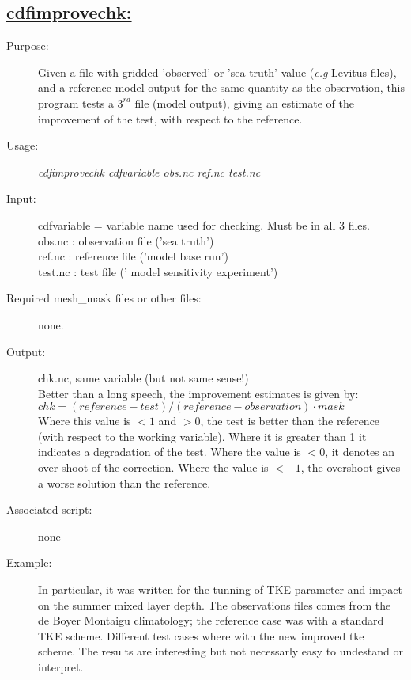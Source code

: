 \documentclass[a4paper,11pt]{article}
\begin{document}
\newpage
\subsection*{\underline{cdfimprovechk:}}
\begin{description}
\item[Purpose:] Given a file with gridded 'observed' or 'sea-truth' value ({\it e.g}  Levitus files), and a reference model output for the
same quantity as the observation, this program tests a $3^{rd}$ file (model output), giving an estimate of the improvement of the test,
with respect to the reference. 
\item[Usage:] {\em cdfimprovechk  cdfvariable obs.nc ref.nc test.nc }
\item[Input:]   cdfvariable = variable name used for checking. Must be in all 3 files. \\
                  obs.nc : observation file ('sea truth') \\
                  ref.nc : reference file ('model base run') \\
                  test.nc : test file (' model sensitivity experiment')
\item[Required mesh\_mask files or other files:] none.
\item[Output:] chk.nc, same variable (but not same sense!)\\
        Better than a long speech, the improvement estimates is given by: \\

$ chk = (reference - test ) / ( reference - observation) \cdot mask $ \\

    Where this value is $< 1$  and $ > 0$, the test is better than the reference (with respect to the working variable). Where it is  greater
than 1 it indicates a degradation of the test. Where the value is $< 0$, it denotes an over-shoot of the correction. Where the value is $< -1$,
 the overshoot gives a worse solution than the reference.
\item[Associated script:] none
\item[Example:]  In particular, it was written for the tunning of TKE parameter and impact on the summer mixed layer depth. The observations
files comes from the de Boyer Montaigu climatology; the reference case was with a standard TKE scheme. Different test cases where with the
new improved tke scheme.  The results are interesting but not necessarly easy to undestand or interpret.

\end{description}
\newpage
\end{document}
